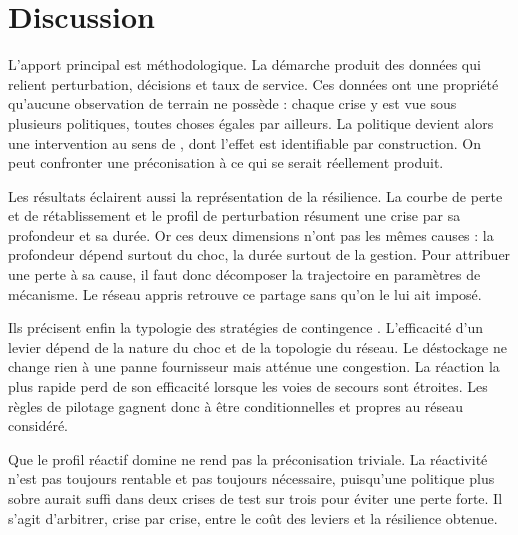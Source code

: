 \section{Discussion}
\label{sec:5}

\label{sec:5.1}

L'apport principal est méthodologique. La démarche produit des données qui relient perturbation, décisions et taux de service. Ces données ont une propriété qu'aucune observation de terrain ne possède : chaque crise y est vue sous plusieurs politiques, toutes choses égales par ailleurs. La politique devient alors une intervention au sens de \citet{pearl2009}, dont l'effet est identifiable par construction. On peut confronter une préconisation à ce qui se serait réellement produit.

Les résultats éclairent aussi la représentation de la résilience. La courbe de perte et de rétablissement \citep{bruneau2003} et le profil de perturbation \citep{sheffi2005book} résument une crise par sa profondeur et sa durée. Or ces deux dimensions n'ont pas les mêmes causes : la profondeur dépend surtout du choc, la durée surtout de la gestion. Pour attribuer une perte à sa cause, il faut donc décomposer la trajectoire en paramètres de mécanisme. Le réseau appris retrouve ce partage sans qu'on le lui ait imposé.

Ils précisent enfin la typologie des stratégies de contingence \citep{tomlin2006,chopra2004}. L'efficacité d'un levier dépend de la nature du choc et de la topologie du réseau. Le déstockage ne change rien à une panne fournisseur mais atténue une congestion. La réaction la plus rapide perd de son efficacité lorsque les voies de secours sont étroites. Les règles de pilotage gagnent donc à être conditionnelles et propres au réseau considéré.

Que le profil réactif domine ne rend pas la préconisation triviale. La réactivité n'est pas toujours rentable et pas toujours nécessaire, puisqu'une politique plus sobre aurait suffi dans deux crises de test sur trois pour éviter une perte forte. Il s'agit d'arbitrer, crise par crise, entre le coût des leviers et la résilience obtenue.

\label{sec:5.2}

